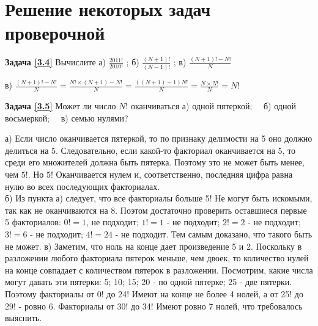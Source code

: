 \section{Решение некоторых задач проверочной}

\textbf{Задача \ref{3.4}}
	Вычислите а) $\frac{2011!}{2010!}$ ;  б) $\frac{(N+1)!}{(N-1)!}$ ; в)  $\frac{(N+1)!-N!}{N}$

\begin{prf}
	в) $\frac{(N+1)!-N!}{N}=\frac{N!\times (N+1)-N!}{N}=\frac{((N+1)-1)N!}{N}=\frac{N\times N!}{N}=N! $
\end{prf}

\textbf{Задача \ref{3.5}}
	Может ли число $N!$ оканчиваться а) одной пятеркой;~~ б) одной восьмеркой;~~ в) семью нулями?

\begin{prf}
	а) Если число оканчивается пятеркой, то по признаку делимости на 5 оно должно делиться на 5. Следовательно, если какой-то факториал оканчивается на 5, то среди его множителей должна быть пятерка. Поэтому это не может быть менее, чем $ 5! $. Но $ 5! $ Оканчивается нулем и, соответственно, последняя цифра равна нулю во всех последующих факториалах.\\  б) Из пункта а) следует, что все факториалы больше 5! Не могут быть искомыми, так как не оканчиваются на 8. Поэтом достаточно проверить оставшиеся первые 5 факториалов: $ 0! = 1 $, не подходит; $ 1! = 1 $ - не подходит; $ 2! = 2 $ - не подходит; $ 3! = 6 $ - не подходит; $ 4! = 24 $ - не подходит. Тем самым доказано, что такого быть не может. в) Заметим, что ноль на конце дает произведение 5 и 2. Поскольку в разложении любого факториала пятерок меньше, чем двоек, то количество нулей на конце совпадает с количеством пятерок в разложении. Посмотрим, какие числа могут давать эти пятерки: 5; 10; 15; 20 - по одной пятерке; 25 - две пятерки. Поэтому факториалы от 0! до 24! Имеют на конце не более 4 нолей, а от 25! до 29! - ровно 6. Факториалы от 30! до 34! Имеют ровно 7 нолей, что требовалось выяснить.
\end{prf}